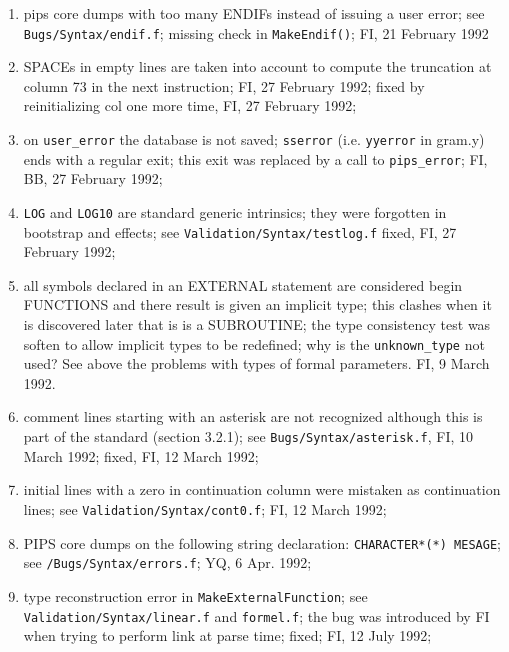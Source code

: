 \begin{enumerate}
  \item pips core dumps with too many ENDIFs instead of issuing a user
	error; see \verb+Bugs/Syntax/endif.f+; missing check in
	\verb+MakeEndif()+; FI, 21 February 1992

  \item SPACEs in empty lines are taken into account to compute the
	truncation at column 73 in the next instruction; FI, 27 February
	1992; fixed by reinitializing col one more time, FI, 27 February 1992;

  \item	on \verb+user_error+ the database is not saved; \verb+sserror+
	(i.e. \verb+yyerror+ in gram.y) ends with a regular exit;
	this exit was replaced by a call to \verb+pips_error+; FI, BB,
	27 February 1992;

  \item \verb+LOG+ and \verb+LOG10+ are standard generic intrinsics;
	they were forgotten in bootstrap and effects; 
	see \verb+Validation/Syntax/testlog.f+
	fixed, FI, 27 February 1992;

  \item all symbols declared in an EXTERNAL statement are considered
	begin FUNCTIONS and there result is given an implicit type;
	this clashes when it is discovered later that is is a SUBROUTINE;
	the type consistency test was soften to allow implicit types
	to be redefined; why is the \verb+unknown_type+ not used? See
	above the problems with types of formal parameters. FI, 9 March 1992.

  \item comment lines starting with an asterisk are not recognized
	although this is part of the standard (section 3.2.1);
	see \verb+Bugs/Syntax/asterisk.f+, FI, 10 March 1992;
	fixed, FI, 12 March 1992;

  \item initial lines with a zero in continuation column were mistaken
	as continuation lines; see \verb+Validation/Syntax/cont0.f+;
	FI, 12 March 1992;

  \item PIPS core dumps on the following string declaration:
	\verb+CHARACTER*(*) MESAGE+; see \verb+/Bugs/Syntax/errors.f+; YQ,
        6 Apr. 1992;

  \item type reconstruction error in \verb+MakeExternalFunction+; see
	\verb+Validation/Syntax/linear.f+ and \verb+formel.f+; the bug
	was introduced by FI when trying to perform link at parse time;
	fixed; FI, 12 July 1992;


\end{enumerate}
